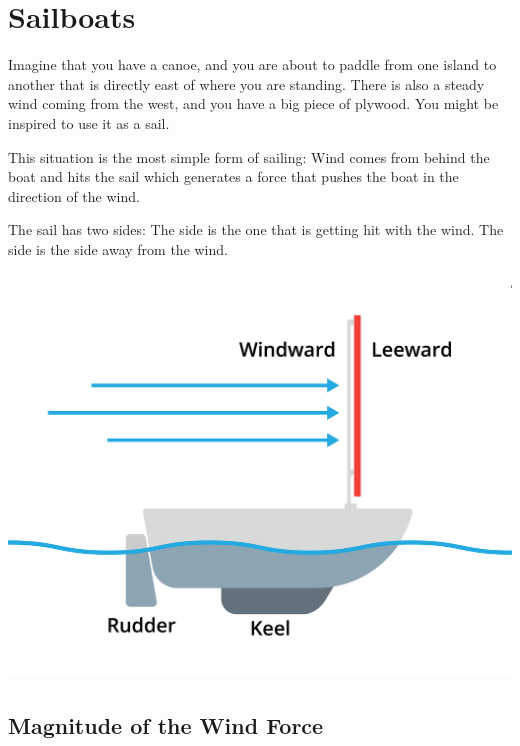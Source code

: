 \chapter{Sailboats}

Imagine that you have a canoe, and you are about to paddle from one island to another that is directly east of where you are standing. There 
is also a steady wind coming from the west, and you have a big piece of plywood.  You might be inspired to use it as a sail.

This situation is the most simple form of sailing: Wind comes from behind the boat and hits the sail which generates a force that pushes the 
boat in the direction of the wind.

The sail has two sides:  The  side is the one that is getting hit with the wind. The  side is the side away from the wind.
\begin{center}
    \includegraphics[width=.75\textwidth]{plywood.png}
    
\end{center}

\section{Magnitude of the Wind Force}

